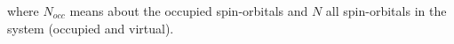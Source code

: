 \noindent where $N_{occ}$ means about the occupied spin-orbitals and $N$ all
spin-orbitals in the system (occupied and virtual).
%

%
%
%
%
